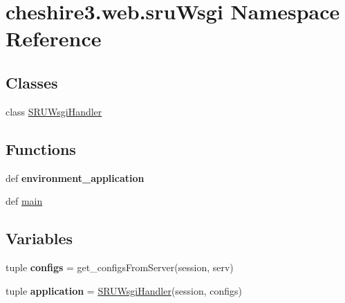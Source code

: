 \hypertarget{namespacecheshire3_1_1web_1_1sru_wsgi}{\section{cheshire3.\-web.\-sru\-Wsgi Namespace Reference}
\label{namespacecheshire3_1_1web_1_1sru_wsgi}
}
\subsection*{Classes}
\begin{DoxyCompactItemize}
\item 
class \hyperlink{classcheshire3_1_1web_1_1sru_wsgi_1_1_s_r_u_wsgi_handler}{S\-R\-U\-Wsgi\-Handler}
\end{DoxyCompactItemize}
\subsection*{Functions}
\begin{DoxyCompactItemize}
\item 
\hypertarget{namespacecheshire3_1_1web_1_1sru_wsgi_a885859f0cd736dafe04405ecd6de09bf}{def {\bfseries environment\-\_\-application}}\label{namespacecheshire3_1_1web_1_1sru_wsgi_a885859f0cd736dafe04405ecd6de09bf}

\item 
def \hyperlink{namespacecheshire3_1_1web_1_1sru_wsgi_a32ef75c697c04cbd2fbf6903f8ebe24e}{main}
\end{DoxyCompactItemize}
\subsection*{Variables}
\begin{DoxyCompactItemize}
\item 
\hypertarget{namespacecheshire3_1_1web_1_1sru_wsgi_a4c2c581d9cf55dd6d372777011f9fa2a}{tuple {\bfseries configs} = get\-\_\-configs\-From\-Server(session, serv)}\label{namespacecheshire3_1_1web_1_1sru_wsgi_a4c2c581d9cf55dd6d372777011f9fa2a}

\item 
\hypertarget{namespacecheshire3_1_1web_1_1sru_wsgi_a1c646f3ca9b9b83797ce394f791502a8}{tuple {\bfseries application} = \hyperlink{classcheshire3_1_1web_1_1sru_wsgi_1_1_s_r_u_wsgi_handler}{S\-R\-U\-Wsgi\-Handler}(session, configs)}\label{namespacecheshire3_1_1web_1_1sru_wsgi_a1c646f3ca9b9b83797ce394f791502a8}

\end{DoxyCompactItemize}


